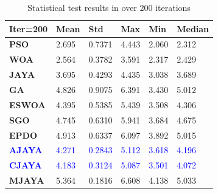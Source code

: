 \documentclass[3p,twocolumn]{elsarticle}
\theoremstyle{thmstyleone}%
\theoremstyle{thmstyletwo}%
\theoremstyle{thmstylethree}%
\begin{document}
\begin{table}[]
	\caption{Statistical test results in over 200 iterations}
	\label{testcase2}
	\centering
	\begin{tabular}{@{}llllll@{}}
		\toprule
		\textbf{Iter=200} & \textbf{Mean} & \textbf{Std} & \textbf{Max} & \textbf{Min} & \textbf{Median} \\ \midrule
		\textbf{PSO}      & 2.695        & 0.7371     & 4.443       & 2.060       & 2.312           \\
		\textbf{WOA}      & 2.564      & 0.3782     & 3.591        & 2.317        & 2.429           \\
		\textbf{JAYA}     & 3.695        & 0.4293     & 4.435       & 3.038        & 3.689           \\
		\textbf{GA}       & 4.826      & 0.9075     & 6.391        & 3.430         & 5.012           \\
		\textbf{ESWOA}    & 4.395        & 0.5385     & 5.439        & 3.508      & 4.306         \\
        \textbf{SGO}    & 4.745        & 0.6310     & 5.941        & 3.684      & 4.675         \\
        \textbf{EPDO}    & 4.913        & 0.6337     & 6.097        & 3.892      & 5.015         \\
        \textcolor{blue}{\textbf{AJAYA}} & \textcolor{blue}{4.271} & \textcolor{blue}{0.2843} & \textcolor{blue}{5.112} & \textcolor{blue}{3.618} & \textcolor{blue}{4.196} \\
        \textcolor{blue}{\textbf{CJAYA}} & \textcolor{blue}{4.183} & \textcolor{blue}{0.3124} & \textcolor{blue}{5.087} & \textcolor{blue}{3.501} & \textcolor{blue}{4.072} \\
		\textbf{MJAYA}    & 5.364      & 0.1816     & 6.608        & 4.138        & 5.033           \\ \bottomrule
	\end{tabular}
\end{table}
\end{document}
